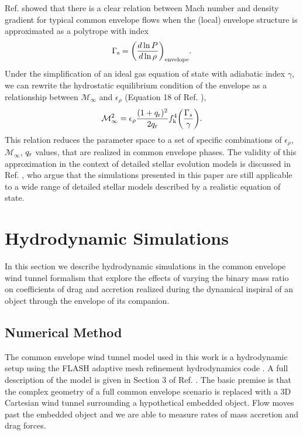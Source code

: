 Ref. \cite{MacLeod:2017} showed that there is a clear relation between Mach number and density gradient for typical common envelope flows when the (local) envelope structure is approximated as a polytrope with index 
\begin{equation}
\Gamma_{\rm s} = \bigg(\frac{d\ln{P}}{d\ln{\rho}}\bigg)_{\rm envelope}.
\end{equation}
Under the simplification of an ideal gas equation of state with adiabatic index $\gamma$, we can rewrite the hydrostatic equilibrium condition of the envelope as a relationship between $\mathcal{M}_\infty$ and $\epsilon_\rho$ (Equation 18 of Ref. \cite{MacLeod:2017}), 
\begin{equation}\label{eq:mach-erho}
\mathcal{M}^2_\infty = \epsilon_\rho \frac{(1 + q_{\rm r})^2}{2q_{\rm r}}f_{\rm k}^4 \bigg(\frac{\Gamma_s}{\gamma}\bigg).
\end{equation}
This relation reduces the parameter space to a set of specific combinations of $\epsilon_\rho$, $\mathcal{M}_\infty$, $q_{\rm r}$ values, that are realized in common envelope phases.
The validity of this approximation in the context of detailed stellar evolution models is discussed in Ref. \cite{Everson:2020eeq}, who argue that the simulations presented in this paper are still applicable to a wide range of detailed stellar models described by a realistic equation of state.

\vspace{0.5cm}
\section{Hydrodynamic Simulations\label{sec:hydro_sims}}
In this section we describe hydrodynamic simulations in the common envelope wind tunnel formalism \cite{MacLeod:2017} that explore the effects of varying the binary mass ratio on coefficients of drag and accretion realized during the dynamical inspiral of an object through the envelope of its companion.  

\subsection{Numerical Method}\label{sec:method}
The common envelope wind tunnel model used in this work is a hydrodynamic setup using the FLASH adaptive mesh refinement hydrodynamics code \cite{Fryxell2000}. A full description of the model is given in Section 3 of Ref. \cite{MacLeod:2017}. The basic premise is that the complex geometry of a full common envelope scenario is replaced with a 3D Cartesian wind tunnel surrounding a hypothetical embedded object. Flow moves past the embedded object and we are able to measure rates of mass accretion and drag forces. 

